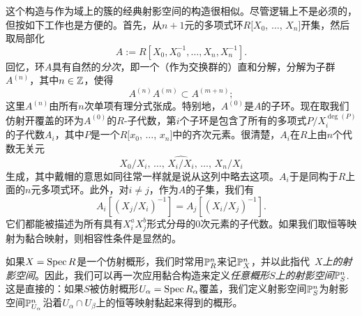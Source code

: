 这个构造与作为域上的簇的经典射影空间的构造很相似。尽管逻辑上不是必须的，但按如下工作也是方便的。首先，从$n+1$元的多项式环$R[X_0$, $\dots$, $X_n]$开集，然后取局部化
\[
	A:=R[X_0,X_0^{-1},\dots,X_n,X_n^{-1}].
\]
回忆，环$A$具有自然的\textit{分次}，即一个（作为交换群的）直和分解，分解为子群$A^{(n)}$，其中$n\in \zz$，使得
\[
	A^{(n)}A^{(m)}\subset A^{(m+n)};
\]
这里$A^{(n)}$由所有$n$次单项有理分式张成。特别地，$A^{(0)}$是$A$的子环。现在取我们仿射开覆盖的环为$A^{(0)}$的$R$-子代数，第$i$个子环是包含了所有的多项式$P/X_i^{\deg(P)}$的子代数$A_i$，其中$P$是一个$R[x_0$, $\dots$, $x_n]$中的齐次元素。很清楚，$A_i$在$R$上由$n$个代数无关元
\[
	X_0/X_i,\,\dots,\,\widehat{X_i/X_i},\,\dots,\,X_n/X_i
\]
生成，其中戴帽的意思如同往常一样就是说从这列中略去这项。$A_i$于是同构于$R$上面的$n$元多项式环。此外，对$i\neq j$，作为$A$的子集，我们有
\[
	A_i[(X_j/X_i)^{-1}]=A_j[(X_i/X_j)^{-1}].
\]
它们都能被描述为所有具有$X_i^aX_j^b$形式分母的$0$次元素的子代数。如果我们取恒等映射为黏合映射，则相容性条件是显然的。

如果$X=\spec R$是一个仿射概形，我们时常用$\P^n_R$来记$\P^n_X$，并以此指代~\textit{$X$上的射影空间}。因此，我们可以再一次应用黏合构造来定义\textit{任意概形$S$上的射影空间$\P_S^n$}. 这是直接的：如果$S$被仿射概形$U_\alpha=\spec R_\alpha$覆盖，我们定义射影空间$\P_S^n$为射影空间$\P_{U_\alpha}^n$沿着$U_\alpha\cap U_\beta$上的恒等映射黏起来得到的概形。

